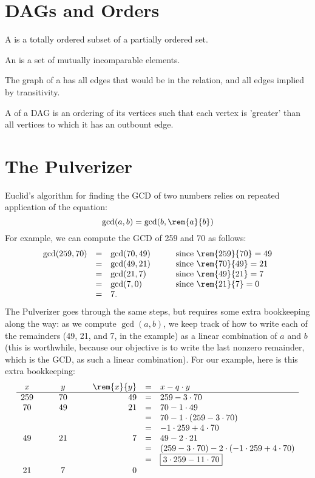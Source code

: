 \documentclass[quiz]{mcs}
\begin{document}
\section{DAGs and Orders}

A  is a totally ordered subset of a partially ordered set.

An  is a set of mutually incomparable elements.

The graph of a  has all edges that would
      be in the relation, and all edges implied by transitivity.

A  of a DAG is an ordering of its vertices
      such that each vertex is 'greater' than all vertices to which it has
      an outbount edge.
\fi

\section{The Pulverizer}
Euclid's algorithm for finding the GCD of two numbers relies on
repeated application of the equation: 
\[
\gcd(a, b) = \gcd(b, \rem{a}{b})
\]
For example, we can compute the GCD of 259 and 70 as follows:
\[
\begin{array}{rclcl}
\gcd(259, 70)
    & = & \gcd(70, 49) & \quad & \text{since $\rem{259}{70} = 49$}\\
    & = & \gcd(49, 21) && \text{since $\rem{70}{49} = 21$} \\
    & = & \gcd(21, 7) && \text{since $\rem{49}{21} = 7$} \\
    & = & \gcd(7, 0) && \text{since $\rem{21}{7} = 0$} \\
    & = & 7.
\end{array}
\]
The Pulverizer goes through the same steps, but requires some extra
bookkeeping along the way: as we compute $\gcd(a, b)$, we keep track
of how to write each of the remainders (49, 21, and 7, in the example)
as a linear combination of $a$ and $b$ (this is worthwhile, because
our objective is to write the last nonzero remainder, which is the
GCD, as such a linear combination).  For our example, here is this
extra bookkeeping:
\[
\begin{array}{ccccrcl}
x & \quad & y & \quad & \rem{x}{y} & = & x - q \cdot y \\ \hline
259 && 70 && 49 & = &   259 - 3 \cdot 70 \\
70 && 49 && 21  & = &   70 - 1 \cdot 49 \\
&&&&            & = &   70 - 1 \cdot (259 - 3 \cdot 70) \\
&&&&            & = &   -1 \cdot 259 + 4 \cdot 70 \\
49 && 21 && 7   & = &   49 - 2 \cdot 21 \\
&&&&            & = &   (259 - 3 \cdot 70) -
                                2 \cdot (-1 \cdot 259 + 4 \cdot 70) \\
&&&&            & = &   \fbox{$3 \cdot 259 - 11 \cdot 70$} \\
21 && 7 && 0
\end{array}
\]
\end{document}
